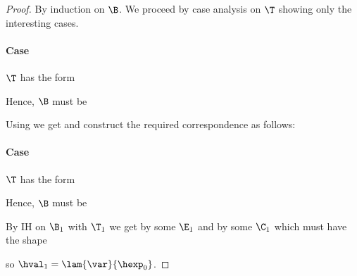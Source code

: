 \begin{proof}

By induction on $\B$. We proceed by case analysis on $\T$ showing only the interesting cases.

\paragraph{Case \textnormal{}}
$\T$ has the form
\begin{prooftree}
\end{prooftree}
Hence, $\B$ must be
\begin{prooftree}
\end{prooftree}
Using  we get  and construct the required correspondence as follows:
\begin{prooftree}
\end{prooftree}

\paragraph{Case \textnormal{}}
$\T$ has the form
\begin{prooftree}
\end{prooftree}
Hence, $\B$ must be
\begin{prooftree}
\end{prooftree}

By IH on $\B_1$ with $\T_1$ we get  by some $\E_1$ and  by some $\C_1$ which must have the shape
\begin{prooftree}
\end{prooftree}
so $\hval_1 = \lam{\var}{\hexp_0}$.


\end{proof}
